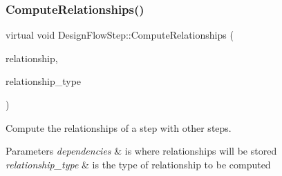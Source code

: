 \subsubsection{\texorpdfstring{Compute\+Relationships()}{ComputeRelationships()}}
{\footnotesize\ttfamily virtual void Design\+Flow\+Step\+::\+Compute\+Relationships (\begin{DoxyParamCaption}\item[{\hyperlink{classDesignFlowStepSet}{Design\+Flow\+Step\+Set} \&}]{relationship,  }\item[{const \hyperlink{classDesignFlowStep_a723a3baf19ff2ceb77bc13e099d0b1b7}{Design\+Flow\+Step\+::\+Relationship\+Type}}]{relationship\+\_\+type }\end{DoxyParamCaption})\hspace{0.3cm}{\ttfamily [pure virtual]}}



Compute the relationships of a step with other steps. 


\begin{DoxyParams}{Parameters}
{\em dependencies} & is where relationships will be stored \\
\hline
{\em relationship\+\_\+type} & is the type of relationship to be computed \\
\hline
\end{DoxyParams}


